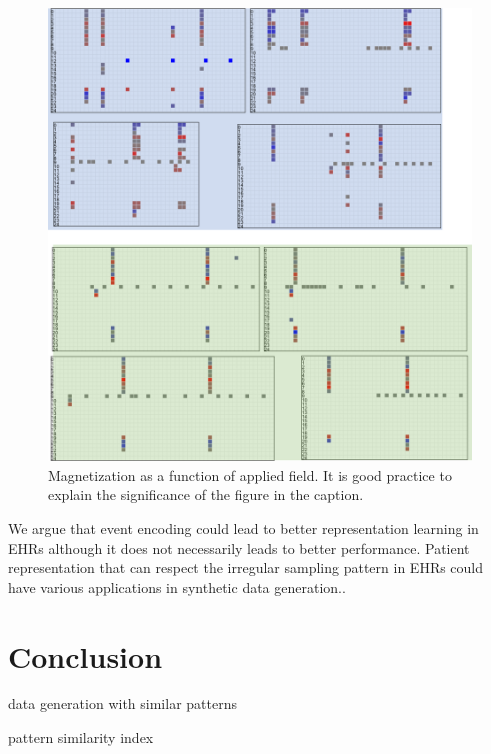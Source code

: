 \documentclass[journal,twoside,web]{ieeecolor}
\begin{document}
\begin{figure}[!h]

    \centerline{\includegraphics{images/knn_patterns.png}}
    
    \caption{Magnetization as a function of applied field.
    It is good practice to explain the significance of the figure in the caption.}
    \label{fig2}
\end{figure}

We argue that event encoding could lead to better representation learning in EHRs although it does not necessarily leads to better performance. Patient representation that can respect the irregular sampling pattern in EHRs could have various applications in synthetic data generation..





\section{Conclusion}
\label{sec:Conclusion}

data generation with similar patterns

pattern similarity index
\end{document}
